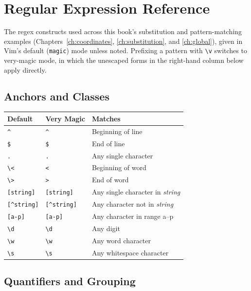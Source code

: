 \chapter{Regular Expression Reference}
\label{app:regex}

The regex constructs used across this book's substitution and pattern-matching examples (Chapters~\ref{ch:coordinates}, \ref{ch:substitution}, and \ref{ch:global}), given in Vim's default (\texttt{magic}) mode unless noted. Prefixing a pattern with \texttt{\textbackslash v} switches to very-magic mode, in which the unescaped forms in the right-hand column below apply directly.

\section{Anchors and Classes}

\begin{longtable}{@{}l l p{6.5cm}@{}}
\textbf{Default} & \textbf{Very Magic} & \textbf{Matches} \\
\hline
\endhead
\texttt{\textasciicircum} & \texttt{\textasciicircum} & Beginning of line \\
\texttt{\$} & \texttt{\$} & End of line \\
\texttt{.} & \texttt{.} & Any single character \\
\texttt{\textbackslash<} & \texttt{<} & Beginning of word \\
\texttt{\textbackslash>} & \texttt{>} & End of word \\
\texttt{[string]} & \texttt{[string]} & Any single character in \textit{string} \\
\texttt{[\textasciicircum string]} & \texttt{[\textasciicircum string]} & Any character not in \textit{string} \\
\texttt{[a-p]} & \texttt{[a-p]} & Any character in range a--p \\
\texttt{\textbackslash d} & \texttt{\textbackslash d} & Any digit \\
\texttt{\textbackslash w} & \texttt{\textbackslash w} & Any word character \\
\texttt{\textbackslash s} & \texttt{\textbackslash s} & Any whitespace character \\
\end{longtable}

\section{Quantifiers and Grouping}

